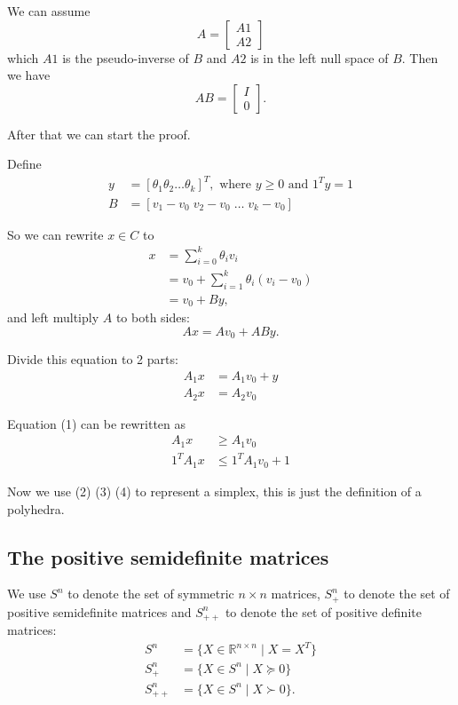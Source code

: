 \documentclass[lang=en,color=blue,mode=fancy,titlestyle=hang]{elegantbook}
\begin{document}
We can assume
\[
A = \begin{bmatrix} A1 \\ A2 \end{bmatrix}
\]
which $A1$ is the pseudo-inverse of $B$ and $A2$ is in the left null space of $B$. Then we have
\[
A B = \begin{bmatrix} I \\ 0 \end{bmatrix}.
\]

After that we can start the proof.

Define
\begin{align*}
y &= [\theta_1 \theta_2 \ldots \theta_k]^T, \text{ where } y \geq 0 \text{ and } 1^{T}y = 1 \\
B &= [v_1 - v_0 \; v_2 - v_0 \; \ldots \; v_k - v_0]
\end{align*}

So we can rewrite $x \in C$ to
\begin{align*}
x &= \sum_{i=0}^{k} \theta_i v_i \\
  &= v_0 + \sum_{i=1}^{k} \theta_i (v_i - v_0) \\
  &= v_0 + B y,
\end{align*}
and left multiply $A$ to both sides:
\[
A x = A v_0 + A B y.
\]

Divide this equation to 2 parts:
\begin{align}
A_1x &= A_1 v_0 + y \\
A_2x &= A_2 v_0
\end{align}

Equation (1) can be rewritten as
\begin{align}
A_1x &\geq A_1 v_0 \\
1^{T}A_1x &\leq 1^{T}A_1 v_0 + 1
\end{align}

Now we use (2) (3) (4) to represent a simplex, this is just the definition of a polyhedra.

\subsection{The positive semidefinite matrices}

We use $S^n$ to denote the set of symmetric $n \times n$ matrices, $S^n_+$ to denote
the set of positive semidefinite matrices and $S^n_{++}$ to denote the set of positive
definite matrices:
\begin{align*}
S^n &= \{X \in \mathbb{R}^{n \times n} \;|\; X = X^{T}\} \\
S^n_+ &= \{X \in S^n \;|\; X \succeq 0\} \\
S^n_{++} &= \{X \in S^n \;|\; X \succ 0\}.
\end{align*}
\end{document}
